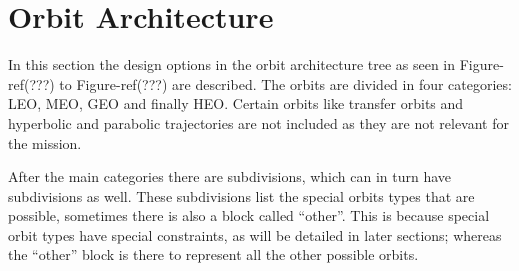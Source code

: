 \section{Orbit Architecture}
\label{blDOOrb}
In this section the design options in the orbit architecture tree as seen in Figure-ref(???) to Figure-ref(???) are described. The orbits are divided in four categories: \ac{LEO}, \ac{MEO}, \ac{GEO} and finally \ac{HEO}. Certain orbits like transfer orbits and hyperbolic and parabolic trajectories are not included as they are not relevant for the mission.

After the main categories there are subdivisions, which can in turn have subdivisions as well. These subdivisions list the special orbits types that are possible, sometimes there is also a block called ``other''. This is because special orbit types have special constraints, as will be detailed in later sections; whereas the ``other'' block is there to represent all the other possible orbits.

